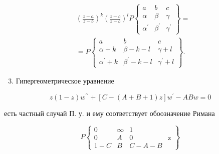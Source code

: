 \documentclass[10pt]{article}
\begin{document}
\[

\begin{aligned}

& \left(\frac{z-a}{z-b}\right)^{k}\left(\frac{z-c}{z-b}\right)^{l} P\left\{\begin{array}{ccc}

a & b & c \\

\alpha & \beta & \gamma \\

\alpha^{\prime} & \beta^{\prime} & \gamma^{\prime}

\end{array}\right\}= \\

& =P\left\{\begin{array}{ccc}

a & b & c \\

\alpha+k & \beta-k-l & \gamma+l \\

\alpha^{\prime}+k & \beta^{\prime}-k-l & \gamma^{\prime}+l

\end{array}\right\} .

\end{aligned}

\]



\begin{enumerate}

  \setcounter{enumi}{2}

  \item Гипергеометрическое уравнение

\end{enumerate}



\[

z(1-z) w^{\prime \prime}+[C-(A+B+1) z] w^{\prime}-A B w=0

\]



есть частный случай П. у. и ему соответствует обоозначение Римана



\[

P\left\{\begin{array}{cccc}

0 & \infty & 1 & \\

0 & A & 0 & \mathrm{z} \\

1-C & B & C-A-B

\end{array}\right\}

\]
\end{document}
